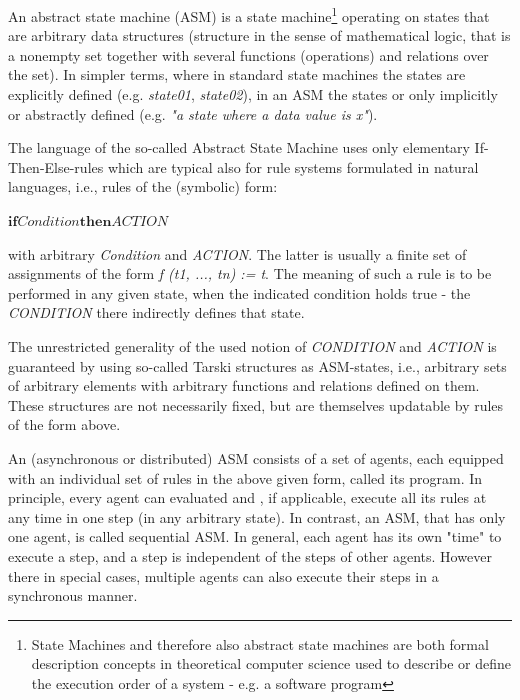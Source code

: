 An abstract state machine (ASM) is a state machine\footnote{State Machines and therefore also abstract state machines are both formal description concepts in theoretical computer science used to describe or define the execution order of a system - e.g. a software program} operating on states that are arbitrary data structures (structure in the sense of mathematical logic, that is a nonempty set together with several functions (operations) and relations over the set). In simpler terms, where in standard state machines the states are explicitly defined (e.g. \textit{state01}, \textit{state02}), in an ASM the states or only implicitly or abstractly defined (e.g. \textit{"a state where a data value is x"}).

The language of the so-called Abstract State Machine uses only elementary If-Then-Else-rules which are typical also for rule systems formulated in natural languages, i.e., rules of the (symbolic) form:

\medskip
$\boldsymbol{if} \textit{Condition} \boldsymbol{then} \textit{ACTION}$
\medskip

with arbitrary \textit{Condition} and \textit{ACTION}. The latter is usually a finite set of assignments of the form \textit{f (t1, ..., tn) := t}. The meaning of such a rule is to be performed in any given state, when the indicated condition holds true - the \textit{CONDITION} there indirectly defines that state.

The unrestricted generality of the used notion of \textit{CONDITION} and \textit{ACTION} is guaranteed by using so-called Tarski structures as ASM-states, i.e., arbitrary sets of arbitrary elements with arbitrary functions and relations defined on them. These structures are not necessarily fixed, but are themselves updatable by rules of the form above. 


An (asynchronous or distributed) ASM consists of a set of agents, each equipped with an individual set of rules in the above given form, called its program. In principle, every agent can evaluated and , if applicable, execute all its rules at any time in one step (in any arbitrary state). In contrast, an ASM, that has only one agent, is called sequential ASM. In general, each agent has its own "time" to execute a step, and a step is independent of the steps of other agents. However there in special cases, multiple agents can also execute their steps in a synchronous manner.

